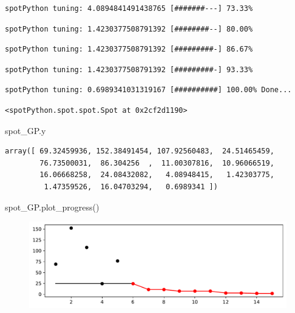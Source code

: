 \documentclass[
  letterpaper,
  DIV=11,
  numbers=noendperiod]{scrreprt}
\newenvironment{Shaded}{\begin{snugshade}}{\end{snugshade}}
\newcommand{\NormalTok}[1]{\textcolor[rgb]{0.00,0.23,0.31}{#1}}
\begin{document}
\begin{verbatim}
spotPython tuning: 4.0894841491438765 [#######---] 73.33% 
\end{verbatim}

\begin{verbatim}
spotPython tuning: 1.4230377508791392 [########--] 80.00% 
\end{verbatim}

\begin{verbatim}
spotPython tuning: 1.4230377508791392 [#########-] 86.67% 
\end{verbatim}

\begin{verbatim}
spotPython tuning: 1.4230377508791392 [#########-] 93.33% 
\end{verbatim}

\begin{verbatim}
spotPython tuning: 0.6989341031319167 [##########] 100.00% Done...
\end{verbatim}

\begin{verbatim}
<spotPython.spot.spot.Spot at 0x2cf2d1190>
\end{verbatim}

\begin{Shaded}
\begin{Highlighting}[]
\NormalTok{spot\_GP.y}
\end{Highlighting}
\end{Shaded}

\begin{verbatim}
array([ 69.32459936, 152.38491454, 107.92560483,  24.51465459,
        76.73500031,  86.304256  ,  11.00307816,  10.96066519,
        16.06668258,  24.08432082,   4.08948415,   1.42303775,
         1.47359526,  16.04703294,   0.6989341 ])
\end{verbatim}

\begin{Shaded}
\begin{Highlighting}[]
\NormalTok{spot\_GP.plot\_progress()}
\end{Highlighting}
\end{Shaded}

\begin{figure}[H]

{\centering \includegraphics{012_num_spot_ei_files/figure-pdf/cell-35-output-1.pdf}

}

\end{figure}
\end{document}
